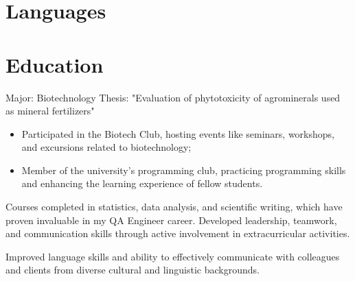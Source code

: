 \documentclass[11pt,a4paper,sans]{moderncv}
\begin{document}
\section{Languages}



\section{Education}
{}{Major: Biotechnology\newline{}
Thesis: "Evaluation of phytotoxicity of agrominerals used as mineral fertilizers"
\begin{itemize}
\item Participated in the Biotech Club, hosting events like seminars, workshops, and excursions related to biotechnology;
\item Member of the university's programming club, practicing programming skills and enhancing the learning experience of fellow students.
\end{itemize}
Courses completed in statistics, data analysis, and scientific writing, which have proven invaluable in my QA Engineer career. Developed leadership, teamwork, and communication skills through active involvement in extracurricular activities.}

{Improved language skills and ability to effectively communicate with colleagues and clients from diverse cultural and linguistic backgrounds.}
\end{document}
